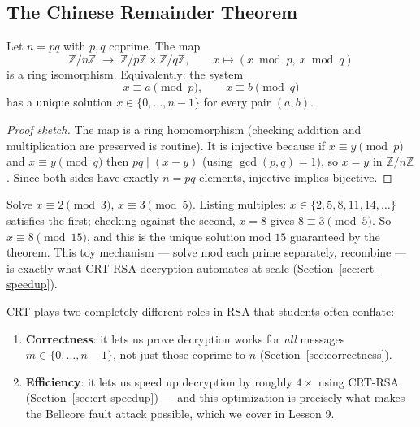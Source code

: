 \subsection{The Chinese Remainder Theorem}

\begin{theorem}[CRT]\label{thm:crt}
Let $n = pq$ with $p, q$ coprime. The map
\[
\mathbb{Z}/n\mathbb{Z} \;\longrightarrow\; \mathbb{Z}/p\mathbb{Z} \times \mathbb{Z}/q\mathbb{Z}, \qquad x \mapsto (x \bmod p,\ x \bmod q)
\]
is a ring isomorphism. Equivalently: the system
\[
x \equiv a \pmod p, \qquad x \equiv b \pmod q
\]
has a unique solution $x \in \{0, \dots, n-1\}$ for every pair $(a,b)$.
\end{theorem}

\begin{proof}[Proof sketch]
The map is a ring homomorphism (checking addition and multiplication are preserved is routine). It is injective because if $x \equiv y \pmod p$ and $x \equiv y \pmod q$ then $pq \mid (x-y)$ (using $\gcd(p,q)=1$), so $x = y$ in $\mathbb{Z}/n\mathbb{Z}$. Since both sides have exactly $n = pq$ elements, injective implies bijective.
\end{proof}

\begin{example}
Solve $x \equiv 2 \pmod 3$, $x \equiv 3 \pmod 5$. Listing multiples: $x \in \{2,5,8,11,14,\dots\}$ satisfies the first; checking against the second, $x=8$ gives $8 \equiv 3 \pmod 5$. \checkmark So $x \equiv 8 \pmod{15}$, and this is the unique solution mod $15$ guaranteed by the theorem. This toy mechanism — solve mod each prime separately, recombine — is exactly what CRT-RSA decryption automates at scale (Section~\ref{sec:crt-speedup}).
\end{example}

\begin{remark}
CRT plays two completely different roles in RSA that students often conflate:
\begin{enumerate}
\item \textbf{Correctness}: it lets us prove decryption works for \emph{all} messages $m \in \{0,\dots,n-1\}$, not just those coprime to $n$ (Section~\ref{sec:correctness}).
\item \textbf{Efficiency}: it lets us speed up decryption by roughly $4\times$ using CRT-RSA (Section~\ref{sec:crt-speedup}) — and this optimization is precisely what makes the Bellcore fault attack possible, which we cover in Lesson 9.
\end{enumerate}
\end{remark}

